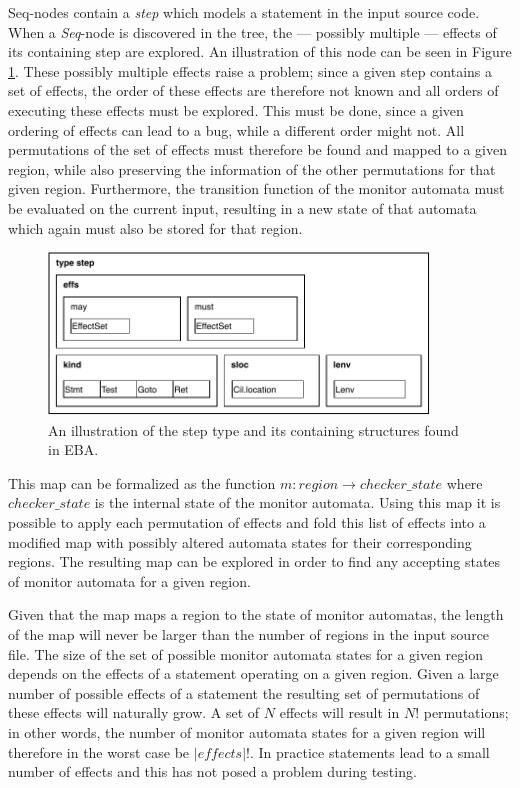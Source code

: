 \noindent Seq-nodes contain a \textit{step} which models a statement in the input source code. When a \textit{Seq}-node is discovered in the tree, the --- possibly multiple --- effects of its containing step are explored. An illustration of this node can be seen in Figure \ref{cfg-step}. These possibly multiple effects raise a problem; since a given step contains a set of effects, the order of these effects are therefore not known and all orders of executing these effects must be explored. This must be done, since a given ordering of effects can lead to a bug, while a different order might not. All permutations of the set of effects must therefore be found and mapped to a given region, while also preserving the information of the other permutations for that given region. Furthermore, the transition function of the monitor automata must be evaluated on the current input, resulting in a new state of that automata which again must also be stored for that region. 


\begin{figure}[H]
    \centering
    \includegraphics[width=0.9\textwidth]{implementation/figures/step}
    \caption{An illustration of the step type and its containing structures found in EBA.}
    \label{cfg-step}
\end{figure}

\noindent This map can be formalized as the function $m: region \rightarrow { checker\_state }$ where $ checker\_state $ is the internal state of the monitor automata. Using this map it is possible to apply each permutation of effects and fold this list of effects into a modified map with possibly altered automata states for their corresponding regions. The resulting map can be explored in order to find any accepting states of monitor automata for a given region. 

\newpar Given that the map maps a region to the state of monitor automatas, the length of the map will never be larger than the number of regions in the input source file. The size of the set of possible monitor automata states for a given region depends on the effects of a statement operating on a given region. Given a large number of possible effects of a statement the resulting set of permutations of these effects will naturally grow. A set of $N$ effects will result in $N!$ permutations; in other words, the number of monitor automata states for a given region will therefore in the worst case be $|effects|!$. In practice statements lead to a small number of effects and this has not posed a problem during testing.

